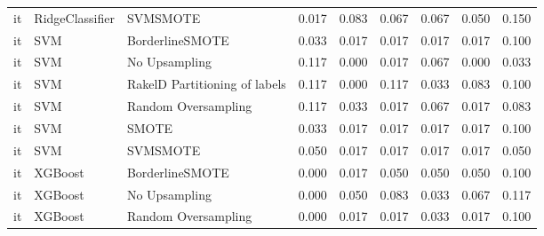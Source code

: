 \begin{tabular}{lllllllll}
      it &                 RidgeClassifier &                      SVMSMOTE &     0.017 &                     0.083 &                 0.067 &                  0.067 &                                   0.050 &     0.150 \\
      it &                             SVM &               BorderlineSMOTE &     0.033 &                     0.017 &                 0.017 &                  0.017 &                                   0.017 &     0.100 \\
      it &                             SVM &                 No Upsampling &     0.117 &                     0.000 &                 0.017 &                  0.067 &                                   0.000 &     0.033 \\
      it &                             SVM & RakelD Partitioning of labels &     0.117 &                     0.000 &                 0.117 &                  0.033 &                                   0.083 &     0.100 \\
      it &                             SVM &           Random Oversampling &     0.117 &                     0.033 &                 0.017 &                  0.067 &                                   0.017 &     0.083 \\
      it &                             SVM &                         SMOTE &     0.033 &                     0.017 &                 0.017 &                  0.017 &                                   0.017 &     0.100 \\
      it &                             SVM &                      SVMSMOTE &     0.050 &                     0.017 &                 0.017 &                  0.017 &                                   0.017 &     0.050 \\
      it &                         XGBoost &               BorderlineSMOTE &     0.000 &                     0.017 &                 0.050 &                  0.050 &                                   0.050 &     0.100 \\
      it &                         XGBoost &                 No Upsampling &     0.000 &                     0.050 &                 0.083 &                  0.033 &                                   0.067 &     0.117 \\
      it &                         XGBoost &           Random Oversampling &     0.000 &                     0.017 &                 0.017 &                  0.033 &                                   0.017 &     0.100 \\

\end{tabular}
